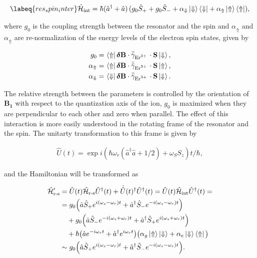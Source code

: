 \begin{equation}
    \labeq{res_spin_inter}
    \cH{int} = \hbar (\hat{a}^\dagger + \hat{a}) \, (g_0 \hat{S}_+ + g_0 \hat{S}_- + \alpha_\Downarrow \ket{\Downarrow}\bra{\Downarrow} + \alpha_\Uparrow \ket{\Uparrow}\bra{\Uparrow}), 
\end{equation}

\noindent where $g_0$ is the coupling strength between the resonator and the spin and $\alpha_\Uparrow$ and $\alpha_\Uparrow$ are re-normalization of the energy levels of the electron spin states, given by

\begin{align}
\begin{split}
    g_0 =&\, \bra{\Uparrow} \boldsymbol{\delta}\mathbf{B} \cdot \bar{\bar{\gamma}}_{\text{Er$^{3+}$\,}} \cdot \mathbf{S} \ket{\Downarrow}, \\ 
    \alpha_\Uparrow =&\, \bra{\Uparrow} \boldsymbol{\delta}\mathbf{B} \cdot \bar{\bar{\gamma}}_{\text{Er$^{3+}$\,}} \cdot \mathbf{S} \ket{\Uparrow}, \\ 
    \alpha_\Downarrow =&\, \bra{\Downarrow} \boldsymbol{\delta}\mathbf{B} \cdot \bar{\bar{\gamma}}_{\text{Er$^{3+}$\,}} \cdot \mathbf{S} \ket{\Downarrow}.
\end{split}
\end{align}

The relative strength between the parameters is controlled by the orientation of $\mathbf{B_1}$ with respect to the quantization axis of the \Er ion, $g_0$ is maximized when they are perpendicular to each other and zero when parallel. The effect of this interaction is more easily understood in the rotating frame of the resonator and the spin. The unitarty transformation to this frame is given by

\begin{align}
    \hat{U}(t) = \exp{i\left(\hbar\omega_r(\hat{a}^\dagger \hat{a} + 1/2) +  \omega_S S_z\right)t/\hbar},
\end{align}

\noindent and the Hamiltonian will be transformed as

\begin{align}
\begin{split}
    \hat{\mathcal{H}}_{\text{r-s}}' &= \hat{U}(t) \hat{\mathcal{H}}_{\text{r-s}} \hat{U}^\dagger(t) + \dot{\hat{U}}(t)^\dagger  \hat{U}^\dagger(t) = \hat{U}(t) \hat{\mathcal{H}}_{\text{int}} \hat{U}^\dagger(t) = \\
    &= g_{0} \Big( \hat{a}\hat{S}_{+} e^{i(\omega_{s}-\omega_{r})t} + \hat{a}^{\dagger}\hat{S}_{-} e^{-i(\omega_{s}-\omega_r)t} \Big) \\
    &\quad + g_{0} \Big(\hat{a}\hat{S}_{-} e^{-i(\omega_{s}+\omega_{r})t} + \hat{a}^{\dagger}\hat{S}_{+} e^{i(\omega_{s}+\omega_r)t} \Big) \\
    &\quad + \hbar \big( \hat{a} e^{-i\omega_{r}t} + \hat{a}^{\dagger} e^{i\omega_rt} \big) 
    \big( \alpha_{g}\ket{\Uparrow} \ket{\Downarrow} + \alpha_{e} \ket{\Downarrow} \bra{\Uparrow} \big) \\
    &\sim g_{0} \Big( \hat{a}\hat{S}_{+} e^{i(\omega_{s}-\omega_r)t} 
    + \hat{a}^{\dagger}\hat{S}_{-} e^{-i(\omega_{s}-\omega_r)t} \Big).
\end{split}
\end{align}

